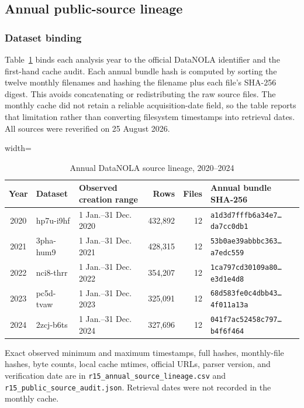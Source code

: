 \documentclass[11pt]{article}
\begin{document}
\subsection{Annual public-source lineage}

\subsubsection{Dataset binding}

Table~\ref{tab:lineage} binds each analysis year to the official DataNOLA identifier and the first-hand cache audit. Each annual bundle hash is computed by sorting the twelve monthly filenames and hashing the filename plus each file's SHA-256 digest. This avoids concatenating or redistributing the raw source files. The monthly cache did not retain a reliable acquisition-date field, so the table reports that limitation rather than converting filesystem timestamps into retrieval dates. All sources were reverified on 25 August 2026.

\begin{table}[!htbp]
\centering
\caption{Annual DataNOLA source lineage, 2020--2024}
\label{tab:lineage}
\begin{adjustbox}{width=\textwidth}
\begin{tabular}{@{}cllrrl@{}}
\toprule
Year & Dataset & Observed creation range & Rows & Files & Annual bundle SHA-256 \\
\midrule
2020 & hp7u-i9hf & 1 Jan.--31 Dec. 2020 & 432,892 & 12 & \texttt{a1d3d7fffb6a34e7\ldots da7cc0db1} \\
2021 & 3pha-hum9 & 1 Jan.--31 Dec. 2021 & 428,315 & 12 & \texttt{53b0ae39abbbc363\ldots a7edc559} \\
2022 & nci8-thrr & 1 Jan.--31 Dec. 2022 & 354,207 & 12 & \texttt{1ca797cd30109a80\ldots e3d1e4d8} \\
2023 & pc5d-tvaw & 1 Jan.--31 Dec. 2023 & 325,091 & 12 & \texttt{68d583fe0c4dbb43\ldots 4f011a13a} \\
2024 & 2zcj-b6ts & 1 Jan.--31 Dec. 2024 & 327,696 & 12 & \texttt{041f7ac52458c797\ldots b4f6f464} \\
\bottomrule
\end{tabular}
\end{adjustbox}
\begin{minipage}{0.98\textwidth}\footnotesize
Exact observed minimum and maximum timestamps, full hashes, monthly-file hashes, byte counts, local cache mtimes, official URLs, parser version, and verification date are in \texttt{r15\_annual\_source\_lineage.csv} and \texttt{r15\_public\_source\_audit.json}. Retrieval dates were not recorded in the monthly cache.
\end{minipage}
\end{table}
\end{document}
